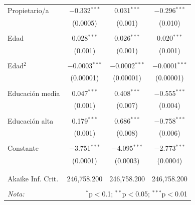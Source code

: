 \documentclass[12pt,a4paper]{article}
\begin{document}
\begin{table}[!htbp]
\begin{tabular}{@{\extracolsep{5pt}}lccc}
 Propietario/a & $-$0.332$^{***}$ & 0.031$^{***}$ & $-$0.296$^{***}$ \\ 
  & (0.0005) & (0.001) & (0.010) \\ 
  & & & \\ 
 Edad & 0.028$^{***}$ & 0.026$^{***}$ & 0.020$^{***}$ \\ 
  & (0.001) & (0.001) & (0.001) \\ 
  & & & \\ 
 Edad$^{2}$ & $-$0.0003$^{***}$ & $-$0.0002$^{***}$ & $-$0.0001$^{***}$ \\ 
  & (0.00001) & (0.00001) & (0.00001) \\ 
  & & & \\ 
 Educación media & 0.047$^{***}$ & 0.408$^{***}$ & $-$0.555$^{***}$ \\ 
  & (0.001) & (0.007) & (0.004) \\ 
  & & & \\ 
 Educación alta & 0.179$^{***}$ & 0.686$^{***}$ & $-$0.758$^{***}$ \\ 
  & (0.001) & (0.008) & (0.006) \\ 
  & & & \\ 
 Constante & $-$3.751$^{***}$ & $-$4.095$^{***}$ & $-$2.773$^{***}$ \\ 
  & (0.0001) & (0.0003) & (0.0004) \\ 
  & & & \\ 
\hline \\[-1.8ex] 
Akaike Inf. Crit. & 246,758.200 & 246,758.200 & 246,758.200 \\ 
\hline 
\hline \\[-1.8ex] 
\textit{Nota:}  & \multicolumn{3}{r}{$^{*}$p$<$0.1; $^{**}$p$<$0.05; $^{***}$p$<$0.01} \\ 
\end{tabular} 
\end{table} 
\newpage
\printbibliography[title={Bibliografía}, heading=bibintoc]
\end{document}
